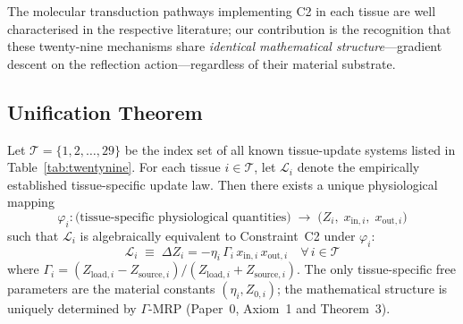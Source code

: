 \documentclass[aps,pre,twocolumn,superscriptaddress,floatfix]{revtex4-2}
\begin{document}
\begin{remark}
\label{rem:substrate-vs-structure}
The molecular transduction pathways implementing C2 in each
tissue are well characterised in the respective
literature; our contribution is the recognition that
these twenty-nine mechanisms share \emph{identical
mathematical structure}---gradient descent on the
reflection action---regardless of their material substrate.
\end{remark}

\subsection{Unification Theorem}

\begin{theorem}
\label{thm:c2-universal}
Let $\mathcal{T} = \{1, 2, \ldots, 29\}$ be the index set
of all known tissue-update systems listed in
Table~\ref{tab:twentynine}.
For each tissue $i \in \mathcal{T}$, let $\mathcal{L}_i$
denote the empirically established tissue-specific
update law.
Then there exists a unique physiological mapping
\begin{equation}
  \varphi_i : \text{(tissue-specific physiological quantities)}
  \;\longrightarrow\;
  \bigl(Z_i,\; x_{\text{in},i},\; x_{\text{out},i}\bigr)
  \label{eq:phi-map}
\end{equation}
such that $\mathcal{L}_i$ is algebraically equivalent to
Constraint~C2 under $\varphi_i$:
\begin{equation}
  \boxed{
  \mathcal{L}_i \;\equiv\;
  \Delta Z_i = -\eta_i\,\Gamma_i\,
  x_{\text{in},i}\,x_{\text{out},i}
  \quad \forall\, i \in \mathcal{T}
  }
  \label{eq:c2-universal}
\end{equation}
where $\Gamma_i = (Z_{\text{load},i} - Z_{\text{source},i})
/(Z_{\text{load},i} + Z_{\text{source},i})$.
The only tissue-specific free parameters are the material
constants $(\eta_i, Z_{0,i})$; the mathematical structure
is uniquely determined by $\Gamma$-MRP
(Paper~0, Axiom~1 and Theorem~3).
\end{theorem}
\end{document}
